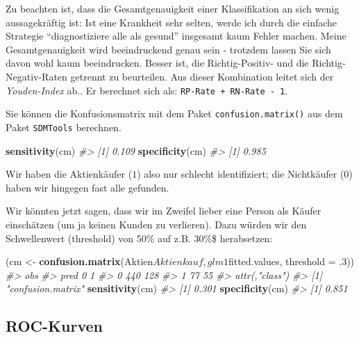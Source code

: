 \documentclass[12pt,ngerman,]{book}
\makeatletter
\newenvironment{Shaded}{\begin{snugshade}}{\end{snugshade}}
\newcommand{\KeywordTok}[1]{\textcolor[rgb]{0.13,0.29,0.53}{\textbf{{#1}}}}
\newcommand{\DataTypeTok}[1]{\textcolor[rgb]{0.13,0.29,0.53}{{#1}}}
\newcommand{\DecValTok}[1]{\textcolor[rgb]{0.00,0.00,0.81}{{#1}}}
\newcommand{\StringTok}[1]{\textcolor[rgb]{0.31,0.60,0.02}{{#1}}}
\newcommand{\CommentTok}[1]{\textcolor[rgb]{0.56,0.35,0.01}{\textit{{#1}}}}
\newcommand{\NormalTok}[1]{{#1}}
\newenvironment{kframe}{%
\medskip{}
\setlength{\fboxsep}{.8em}
 \def\at@end@of@kframe{}%
 \ifinner\ifhmode%
  \def\at@end@of@kframe{\end{minipage}}%
  \begin{minipage}{\columnwidth}%
 \fi\fi%
 \def\FrameCommand##1{\hskip\@totalleftmargin \hskip-\fboxsep
 \colorbox{shadecolor}{##1}\hskip-\fboxsep
     \hskip-\linewidth \hskip-\@totalleftmargin \hskip\columnwidth}%
 \MakeFramed {\advance\hsize-\width
   \@totalleftmargin\z@ \linewidth\hsize
   \@setminipage}}%
 {\par\unskip\endMakeFramed%
 \at@end@of@kframe}
\renewenvironment{Shaded}{\begin{kframe}}{\end{kframe}}
\theoremstyle{definition}
\theoremstyle{definition}
\theoremstyle{remark}
\makeatother
\begin{document}
Zu beachten ist, dass die Gesamtgenauigkeit einer Klassifikation an sich
wenig aussagekräftig ist: Ist eine Krankheit sehr selten, werde ich
durch die einfache Strategie ``diagnostiziere alle als gesund''
insgesamt kaum Fehler machen. Meine Gesamtgenauigkeit wird beeindruckend
genau sein - trotzdem lassen Sie sich davon wohl kaum beeindrucken.
Besser ist, die Richtig-Positiv- und die Richtig-Negativ-Raten getrennt
zu beurteilen. Aus dieser Kombination leitet sich der
\emph{Youden-Index} ab.. Er berechnet sich als:
\texttt{RP-Rate\ +\ RN-Rate\ -\ 1}.

Sie können die Konfusionsmatrix mit dem Paket
\texttt{confusion.matrix()} aus dem Paket \texttt{SDMTools} berechnen.

\begin{Shaded}
\begin{Highlighting}[]
\KeywordTok{sensitivity}\NormalTok{(cm)}
\CommentTok{#> [1] 0.109}
\KeywordTok{specificity}\NormalTok{(cm)}
\CommentTok{#> [1] 0.985}
\end{Highlighting}
\end{Shaded}

Wir haben die Aktienkäufer (\(1\)) also nur schlecht identifiziert; die
Nichtkäufer (\(0\)) haben wir hingegen fast alle gefunden.

Wir könnten jetzt sagen, dass wir im Zweifel lieber eine Person als
Käufer einschätzen (um ja keinen Kunden zu verlieren). Dazu würden wir
den Schwellenwert (threshold) von 50\% auf z.B. 30\%\$ herabsetzen:

\begin{Shaded}
\begin{Highlighting}[]
\NormalTok{(cm <-}\StringTok{ }\KeywordTok{confusion.matrix}\NormalTok{(Aktien$Aktienkauf, glm1$fitted.values, }\DataTypeTok{threshold =} \NormalTok{.}\DecValTok{3}\NormalTok{))}
\CommentTok{#>     obs}
\CommentTok{#> pred   0   1}
\CommentTok{#>    0 440 128}
\CommentTok{#>    1  77  55}
\CommentTok{#> attr(,"class")}
\CommentTok{#> [1] "confusion.matrix"}
\KeywordTok{sensitivity}\NormalTok{(cm)}
\CommentTok{#> [1] 0.301}
\KeywordTok{specificity}\NormalTok{(cm)}
\CommentTok{#> [1] 0.851}
\end{Highlighting}
\end{Shaded}

\subsection{ROC-Kurven}\label{roc-kurven}
\end{document}
